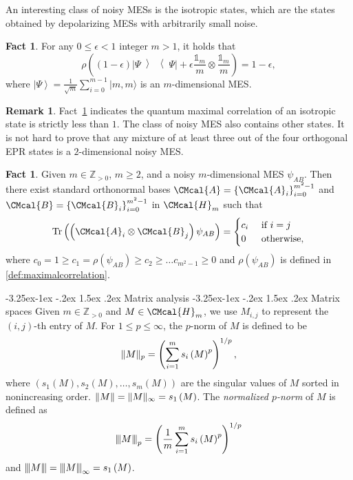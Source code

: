 \documentclass[10pt,a4paper]{article}
\makeatletter
\renewcommand{\subsection}{\@startsection{subsection}{2}{\z@}%
             {-3.25ex\@plus -1ex \@minus -.2ex}%
             {1.5ex \@plus .2ex}%
             {\normalfont\large\scshape\bfseries}}
\renewcommand{\subsubsection}{\@startsection{subsubsection}{2}{\z@}%
             {-3.25ex\@plus -1ex \@minus -.2ex}%
             {1.5ex \@plus .2ex}%
             {\normalfont\normalsize\scshape\bfseries}}
\def\A{\CMcal{A}}
\def\B{\CMcal{B}}
\def\H{\CMcal{H}}
\theoremstyle{plain}
\theoremstyle{definition}
\newtheorem{remark}[theorem]{Remark}
\newtheorem{fact}[theorem]{Fact}
\newcommand {\set} [1] {\ensuremath{ \left\lbrace #1 \right\rbrace }}
\newcommand {\br} [1] {\ensuremath{ \left( #1 \right) }}
\DeclarePairedDelimiter{\norm}{\lVert}{\rVert}
\newcommand {\ket} [1] {\ensuremath{ \left| #1 \right\rangle }}
\newcommand {\ketbratwo} [2] {\ensuremath{ \left| #1 \middle\rangle \middle\langle #2 \right| }}
\newcommand {\ketbra} [1] {\ketbratwo{#1}{#1}}
\newcommand{\nnorm}[1]{{\left\vert\kern-0.25ex\left\vert\kern-0.25ex\left\vert #1
		\right\vert\kern-0.25ex\right\vert\kern-0.25ex\right\vert}}
\newcommand {\Tr} {\ensuremath{ \mathrm{Tr} }}
\newcommand {\id} {\ensuremath{\mathds{1}}}
\newcommand{\posint}{{\mathbb Z}_{>0}}
\newcommand{\1}{\mathbb{1}} %
\makeatother
\begin{document}
	An interesting class of noisy MESs is the isotropic states, which are the states obtained by depolarizing MESs with arbitrarily small noise.
	\begin{fact}\label{lem:noisyeprmaximalcorrelation}\cite[Lemma 3.9]{qin2021nonlocal}
		For any $0\leq\epsilon<1$ integer $m>1$, it holds that
		\[\rho\br{\br{1-\epsilon}\ketbra{\Psi}+\epsilon\frac{\id_{m}}{m}\otimes \frac{\id_{m}}{m}}=1-\epsilon,\]
		where $\ket{\Psi}=\frac{1}{\sqrt{m}}\sum_{i=0}^{m-1}|m,m\rangle$ is an $m$-dimensional MES.
	\end{fact}
 \begin{remark}
Fact~\ref{lem:noisyeprmaximalcorrelation} indicates the quantum maximal correlation of an isotropic state is strictly less than $1$. The class of noisy MES also contains other states. It is not hard to prove that any mixture of at least three out of the four orthogonal EPR states is a $2$-dimensional noisy MES.
 \end{remark}
	
	\begin{fact}\label{lem:normofM}\cite[Lemma 7.4]{qin2021nonlocal}
	Given $m\in\posint$, $m\geq2$, and a noisy $m$-dimensional MES $\psi_{AB}$. Then there exist standard orthonormal bases $\A=\set{\A_i}_{i=0}^{m^2-1}$ and $\B=\set{\B_i}_{i=0}^{m^2-1}$ in $\H_m$ such that
	\begin{equation}\label{eqn:corr}
\Tr\br{\br{\A_i\otimes\B_j}\psi_{AB}}=\begin{cases}c_i~&\mbox{if $i=j$}\\0~&\mbox{otherwise},\end{cases}
\end{equation}
where $c_0=1\geq c_1=\rho\br{\psi_{AB}}\geq c_2\geq\ldots c_{m^2-1}\geq0$ and $\rho\br{\psi_{AB}}$ is defined in \cref{def:maximalcorrelation}.
\end{fact}

\subsection{Matrix analysis}
\subsubsection{Matrix spaces}\label{}
Given $m\in\posint$ and $M\in\H_m$, we use $M_{i,j}$ to represent the $\br{i,j}$-th entry of $M$. For $1\leq p\leq\infty$, the $p$-norm of $M$ is defined to be \[\norm{M}_p=\br{\sum_{i=1}^{m}s_i\br{M}^p}^{1/p},\] where $\br{s_1\br{M},s_2\br{M},\ldots,s_m\br{M}}$ are the singular values of $M$ sorted in nonincreasing order. $\norm{M}=\norm{M}_{\infty}=s_1\br{M}$. 
The {\em normalized $p$-norm} of $M$ is defined as
\begin{equation}\label{eqn:nnormdef}
\nnorm{M}_p=\br{\frac{1}{m}\sum_{i=1}^ms_i\br{M}^p}^{1/p}
\end{equation}
 and $\nnorm{M}=\nnorm{M}_{\infty}=s_1\br{M}$. 
\end{document}
